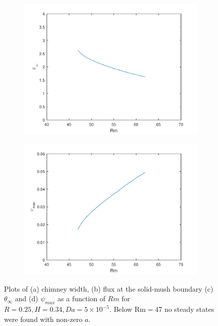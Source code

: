 \documentclass[11pt]{proc}
\begin{document}
\begin{figure}[ht!]
\begin{subfigure}[t]{.48\linewidth}
    \includegraphics[width=\textwidth]{Rm-theta-inf-H0-25R0-34}
    \caption{}
    \label{fig:steady-state-Rm-theta-inf}
 \end{subfigure}
  \quad
 \begin{subfigure}[t]{.48\linewidth}
    \centering
    \includegraphics[width=\textwidth]{Rm-psi-H0-25R0-34}
    \caption{}
    \label{fig:steady-state-Rm-psi}
 \end{subfigure}
 
 \caption{Plots of (a) chimney width, (b) flux at the solid-mush boundary (c) $\theta_\infty$ and (d) $\psi_{max}$ as a function of $Rm$ for $R=0.25, H=0.34, Da=5\times10^{-5}$. Below $\text{Rm} = 47$ no steady states were found with non-zero $a$.}
 \label{fig:parameter-plots}
 \end{figure}
\end{document}
